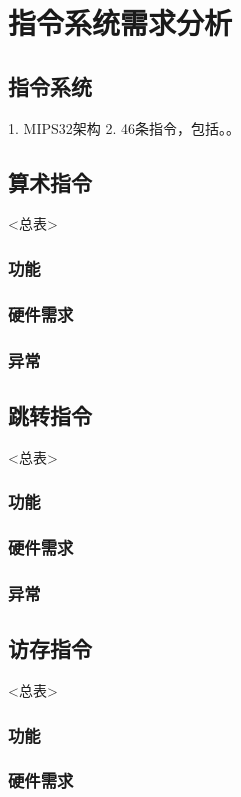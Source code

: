 \chapter{指令系统需求分析}

\section{指令系统}

1. MIPS32架构
2. 46条指令，包括。。

\section{算术指令}
<总表>
    \subsection{功能}
    \subsection{硬件需求}
    \subsection{异常}

\section{跳转指令}
<总表>
    \subsection{功能}
    \subsection{硬件需求}
    \subsection{异常}

\section{访存指令}
<总表>
    \subsection{功能}
    \subsection{硬件需求}
